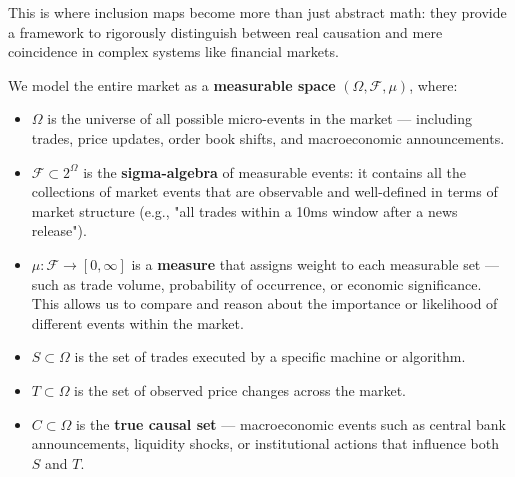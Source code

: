 This is where inclusion maps become more than just abstract math: they provide a framework to rigorously distinguish between real causation and mere coincidence in complex systems like financial markets.

\vspace{1em}
We model the entire market as a \textbf{measurable space} \( (\Omega, \mathcal{F}, \mu) \), where:

\begin{itemize}
    \item \( \Omega \) is the universe of all possible micro-events in the market — including trades, price updates, order book shifts, and macroeconomic announcements.
    
    \item \( \mathcal{F} \subset 2^\Omega \) is the \textbf{sigma-algebra} of measurable events: it contains all the collections of market events that are observable and well-defined in terms of market structure (e.g., "all trades within a 10ms window after a news release").
    
    \item \( \mu: \mathcal{F} \rightarrow [0, \infty] \) is a \textbf{measure} that assigns weight to each measurable set — such as trade volume, probability of occurrence, or economic significance. This allows us to compare and reason about the importance or likelihood of different events within the market.

    \item \( S \subset \Omega \) is the set of trades executed by a specific machine or algorithm.

    \item \( T \subset \Omega \) is the set of observed price changes across the market.

    \item \( C \subset \Omega \) is the \textbf{true causal set} — macroeconomic events such as central bank announcements, liquidity shocks, or institutional actions that influence both \( S \) and \( T \).
\end{itemize}


